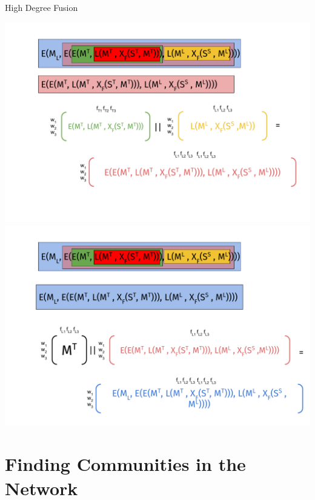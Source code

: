 \documentclass[10pt,=table]{beamer}
\begin{document}
\begin{frame}{High Degree Fusion}
\begin{overprint}
	\includegraphics[width=1\linewidth]{image2/Chapitre2/hybrid_fusion4_a.pdf}%
	\onslide<7>\includegraphics[width=1\linewidth]{image2/Chapitre2/hybrid_fusion4.pdf}%
\end{overprint}
\end{frame}






\section[Contributions in Detail]{Finding Communities in the Network}
\end{document}
